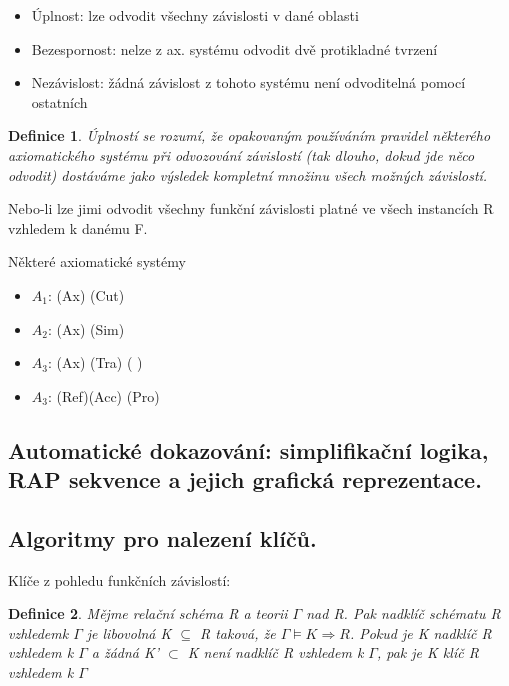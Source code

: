 \documentclass[10pt,a4paper]{article}
\newtheorem{definition}{Definice}
\begin{document}
\begin{itemize}
\item Úplnost: lze odvodit všechny závislosti v dané oblasti
\item Bezespornost: nelze z ax. systému odvodit dvě protikladné tvrzení
\item Nezávislost: žádná závislost z tohoto systému není odvoditelná pomocí ostatních
\end{itemize}

\begin{definition}
Úplností se rozumí, že opakovaným používáním pravidel některého axiomatického systému při odvozování závislostí
(tak dlouho, dokud jde něco odvodit) dostáváme jako výsledek kompletní množinu všech možných závislostí. 
\end{definition}

Nebo-li lze jimi odvodit všechny funkční závislosti platné ve všech instancích R vzhledem k danému F.

Některé axiomatické systémy
\begin{itemize}
\item $A_1$: (Ax) (Cut)
\item $A_2$: (Ax) (Sim)
\item $A_3$: (Ax) (Tra) (   )
\item $A_3$: (Ref)(Acc) (Pro)
\end{itemize}
\subsection{Automatické dokazování: simplifikační logika, RAP sekvence a jejich grafická reprezentace.}


\subsection{Algoritmy pro nalezení klíčů.}
Klíče z pohledu funkčních závislostí:
\begin{definition}
Mějme relační schéma R a teorii $\Gamma$ nad R. Pak nadklíč schématu R vzhledemk $\Gamma$ je libovolná K $\subseteq$ R taková, že $\Gamma \models K \Rightarrow R$. Pokud je K nadklíč R vzhledem k $\Gamma$ a žádná K' $\subset$ K není nadklíč R vzhledem k $\Gamma$, pak je K klíč R vzhledem k $\Gamma$
\end{definition}
\end{document}
